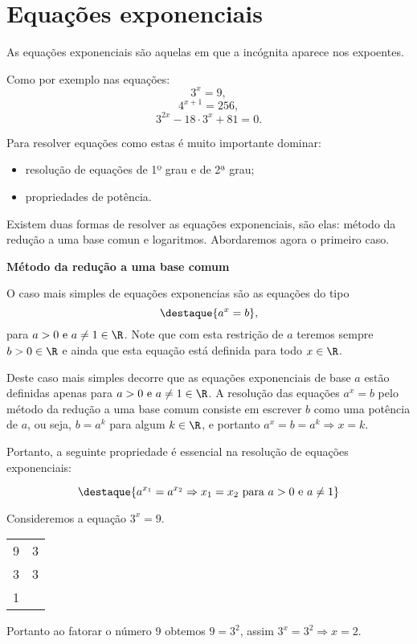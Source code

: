 \section{Equações exponenciais}

  \vskip0.3cm
 \colorbox{azul}{
 \begin{minipage}{0.9\linewidth}
 \begin{center}
  As equações exponenciais são aquelas em que a incógnita aparece nos expoentes.
 \end{center}
 \end{minipage}}
 \vskip0.3cm

 Como por exemplo nas equações:
 \[3^x= 9 ,\]
 \[4^{x+1}= 256 ,\]
 \[3^{2x}- 18\cdot 3^x + 81=0 .\]

 Para resolver equações como estas é muito importante dominar:
 \begin{itemize}
  \item resolução de equações de 1º grau e de 2ª grau;
  \item propriedades de potência.
 \end{itemize}

 Existem duas formas de resolver as equações exponenciais, são elas: método da redução a uma base comun e logaritmos. Abordaremos agora o primeiro caso.

 \vskip0.3cm

 \textbf{Método da redução a uma base comum}

 \vskip0.3cm

 O caso mais simples de equações exponencias são as equações do tipo
 \[\destaque{a^{x}= b} ,\]
 para $a > 0 \text{ e } a \neq 1 \in \R$. Note que com esta restrição de $a$ teremos sempre $b > 0 \in \R$ e ainda que esta equação está definida para todo $x \in \R$.

 Deste caso mais simples decorre que as equações exponenciais de base $a$ estão definidas apenas para $a > 0 \text{ e } a \neq 1 \in \R$. A resolução das equações $a^x= b$ pelo método da redução a uma base comum consiste em escrever $b$ como uma potência de $a$, ou seja, $b= a^k$  para algum $k \in \R$, e portanto $a^{x}= b= a^{k} \Rightarrow x= k$.

 Portanto, a seguinte propriedade é essencial na resolução de equações exponenciais:

 \[\destaque{ a^{x_1}= a^{x_2} \Rightarrow x_1= x_2 \text{ para } a>0 \text{ e } a \neq 1}\]

 \begin{exem}
  Consideremos a equação $3^x= 9$.

  \begin{tabular}{c|c}
  9 & 3 \\
  3 & 3 \\
  1 &
  \end{tabular}

  Portanto ao fatorar o número 9 obtemos $9= 3^2$, assim $3^x= 3^2 \Rightarrow x= 2$.
 \end{exem}

